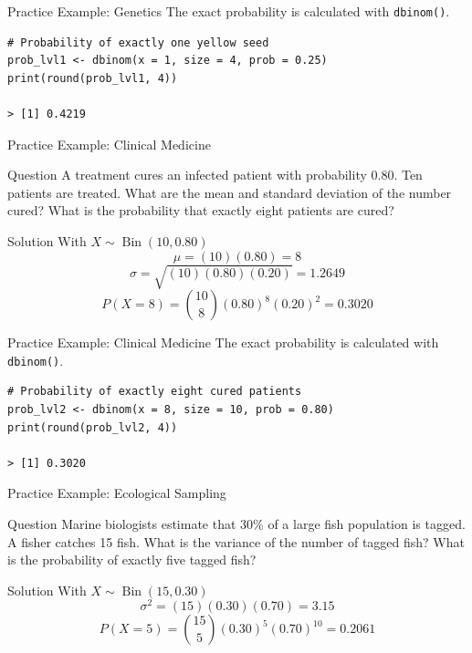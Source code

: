 \documentclass[aspectratio=169]{beamer}
\begin{document}
\begin{frame}[fragile]{Practice Example: Genetics}
The exact probability is calculated with \texttt{dbinom()}.

\begin{verbatim}
# Probability of exactly one yellow seed
prob_lvl1 <- dbinom(x = 1, size = 4, prob = 0.25)
print(round(prob_lvl1, 4))

> [1] 0.4219
\end{verbatim}
\end{frame}

\begin{frame}{Practice Example: Clinical Medicine}
\begin{block}{Question}
A treatment cures an infected patient with probability 0.80. Ten patients are treated. What are the mean and standard deviation of the number cured? What is the probability that exactly eight patients are cured?
\end{block}

\pause

\begin{block}{Solution}
With $X \sim \operatorname{Bin}(10,0.80)$
$$\mu=(10)(0.80)=8$$
$$\sigma=\sqrt{(10)(0.80)(0.20)}=1.2649$$
$$P(X=8)=\binom{10}{8}(0.80)^8(0.20)^2=0.3020$$
\end{block}
\end{frame}

\begin{frame}[fragile]{Practice Example: Clinical Medicine}
The exact probability is calculated with \texttt{dbinom()}.

\begin{verbatim}
# Probability of exactly eight cured patients
prob_lvl2 <- dbinom(x = 8, size = 10, prob = 0.80)
print(round(prob_lvl2, 4))

> [1] 0.3020
\end{verbatim}
\end{frame}

\begin{frame}{Practice Example: Ecological Sampling}
\begin{block}{Question}
Marine biologists estimate that 30\% of a large fish population is tagged. A fisher catches 15 fish. What is the variance of the number of tagged fish? What is the probability of exactly five tagged fish?
\end{block}

\pause

\begin{block}{Solution}
With $X \sim \operatorname{Bin}(15,0.30)$
$$\sigma^2=(15)(0.30)(0.70)=3.15$$
$$P(X=5)=\binom{15}{5}(0.30)^5(0.70)^{10}=0.2061$$
\end{block}
\end{frame}
\end{document}
